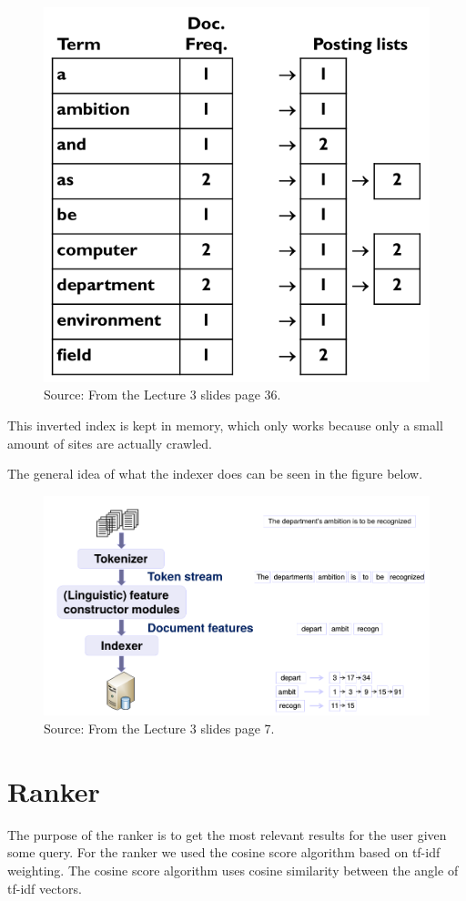 	\begin{figure}
	\centering
	\includegraphics[width=0.7\linewidth]{./Media/InvertedIndex}
	\caption{Source: From the Lecture 3 slides page 36.}
	\label{fig:InvertedIndex}
	\end{figure}
	
	This inverted index is kept in memory, which only works because only a small amount of sites are actually crawled.
	
	The general idea of what the indexer does can be seen in the figure below.
	
	\begin{figure}[H]
	\centering
	\includegraphics[width=0.7\linewidth]{./Media/indexer}
	\caption{Source: From the Lecture 3 slides page 7.}
	\label{fig:indexer}
	\end{figure}
	
	\section{Ranker}
	The purpose of the ranker is to get the most relevant results for the user given some query.
	For the ranker we used the cosine score algorithm based on tf-idf weighting.
	The cosine score algorithm uses cosine similarity between the angle of tf-idf vectors.
	

